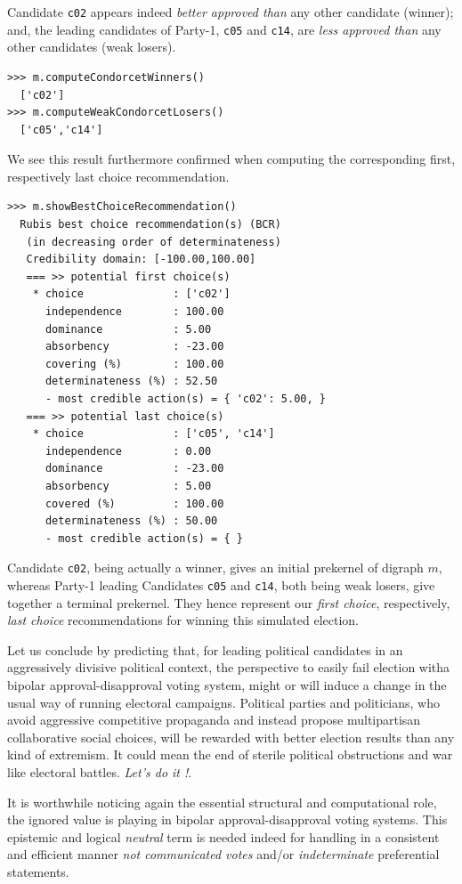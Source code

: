 Candidate \texttt{c02} appears indeed \emph{better approved than} any other candidate (\Condorcet winner); and, the leading candidates of Party-1, \texttt{c05} and \texttt{c14}, are \emph{less approved than} any other candidates (weak \Condorcet losers).
\begin{lstlisting}
>>> m.computeCondorcetWinners()
  ['c02']
>>> m.computeWeakCondorcetLosers()
  ['c05','c14']
\end{lstlisting}

We see this result furthermore confirmed when computing the corresponding first, respectively last choice recommendation.    
\begin{lstlisting}
>>> m.showBestChoiceRecommendation()
  Rubis best choice recommendation(s) (BCR)
   (in decreasing order of determinateness)   
   Credibility domain: [-100.00,100.00]
   === >> potential first choice(s)
    * choice              : ['c02']
      independence        : 100.00
      dominance           : 5.00
      absorbency          : -23.00
      covering (%)        : 100.00
      determinateness (%) : 52.50
      - most credible action(s) = { 'c02': 5.00, }
   === >> potential last choice(s) 
    * choice              : ['c05', 'c14']
      independence        : 0.00
      dominance           : -23.00
      absorbency          : 5.00
      covered (%)         : 100.00
      determinateness (%) : 50.00
      - most credible action(s) = { }
\end{lstlisting}

Candidate \texttt{c02}, being actually a \Condorcet winner, gives an initial prekernel of digraph $m$, whereas Party-1 leading Candidates \texttt{c05} and \texttt{c14}, both being weak \Condorcet losers, give together a terminal prekernel. They hence represent our \emph{first choice}, respectively, \emph{last choice} recommendations for winning this simulated election.

Let us conclude by predicting that, for leading political candidates in an aggressively divisive political context, the perspective to easily fail election witha bipolar approval-disapproval voting system, might or will induce a change in the usual way of running electoral campaigns. Political parties and politicians, who avoid aggressive competitive propaganda and instead propose multipartisan collaborative social choices, will be rewarded with better election results than any kind of extremism. It could mean the end of sterile political obstructions and war like electoral battles. \emph{Let's do it !}.

It is worthwhile noticing again the essential structural and computational role, the ignored value is playing in bipolar approval-disapproval voting systems. This epistemic and logical \emph{neutral} term is needed indeed for handling in a consistent and efficient manner \emph{not communicated votes} and/or \emph{indeterminate} preferential statements.
 
\clearpage
%


